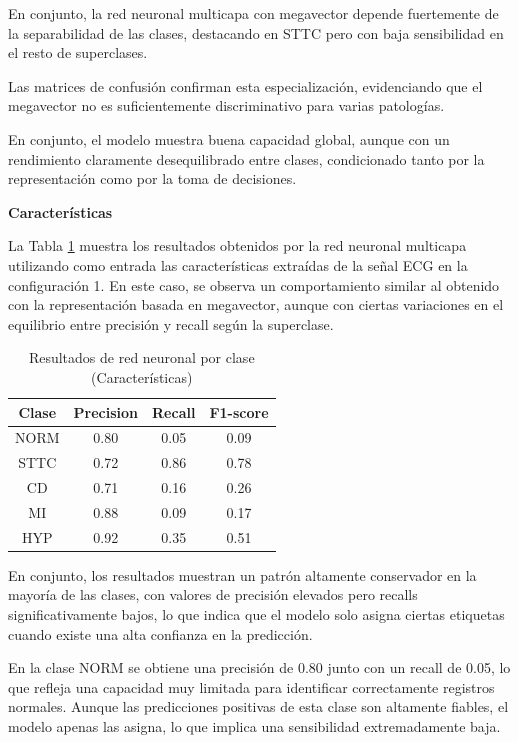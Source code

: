 \documentclass[12pt,a4paper,twoside]{book}
\begin{document}
\vspace{0.5cm}

En conjunto, la red neuronal multicapa con megavector depende fuertemente de la separabilidad de las clases, destacando en STTC pero con baja sensibilidad en el resto de superclases.

Las matrices de confusión confirman esta especialización, evidenciando que el megavector no es suficientemente discriminativo para varias patologías.

En conjunto, el modelo muestra buena capacidad global, aunque con un rendimiento claramente desequilibrado entre clases, condicionado tanto por la representación como por la toma de decisiones.

\vspace{0.5cm}

\textbf{Características}

La Tabla \ref{tab:metrics_clase_mlp_feat} muestra los resultados obtenidos por la red neuronal multicapa utilizando como entrada las características extraídas de la señal ECG en la configuración 1. 
En este caso, se observa un comportamiento similar al obtenido con la representación basada en megavector, aunque con ciertas variaciones en el equilibrio entre precisión y recall según la superclase.

\begin{table}[H]
	\centering
	\begin{tabular}{|c|c|c|c|}
	\hline
	\textbf{Clase} & \textbf{Precision} & \textbf{Recall} & \textbf{F1-score} \\
	\hline
	NORM & 0.80 & 0.05 & 0.09 \\
	STTC & 0.72 & 0.86 & 0.78 \\
	CD   & 0.71 & 0.16 & 0.26 \\
	MI   & 0.88 & 0.09 & 0.17 \\
	HYP  & 0.92 & 0.35 & 0.51 \\
	\hline
	\end{tabular}
	\caption{Resultados de red neuronal por clase (Características)}
	\label{tab:metrics_clase_mlp_feat}
\end{table}

En conjunto, los resultados muestran un patrón altamente conservador en la mayoría de las clases, con valores de precisión elevados pero recalls significativamente bajos, lo que indica que el modelo solo asigna ciertas etiquetas cuando existe una alta confianza en la predicción.

En la clase NORM se obtiene una precisión de 0.80 junto con un recall de 0.05, lo que refleja una capacidad muy limitada para identificar correctamente registros normales. 
Aunque las predicciones positivas de esta clase son altamente fiables, el modelo apenas las asigna, lo que implica una sensibilidad extremadamente baja.
\end{document}
